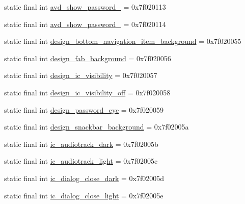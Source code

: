 \begin{CompactItemize}
\item 
static final int \hyperlink{classandroid_1_1support_1_1v7_1_1recyclerview_1_1_r_1_1drawable_74c7af79271260b43cedd3fce8579c79}{avd\_\-show\_\-password\_} = 0x7f020113
\item 
static final int \hyperlink{classandroid_1_1support_1_1v7_1_1recyclerview_1_1_r_1_1drawable_d66f2029f7a8aa3859f6184577970aae}{avd\_\-show\_\-password\_} = 0x7f020114
\item 
static final int \hyperlink{classandroid_1_1support_1_1v7_1_1recyclerview_1_1_r_1_1drawable_83bdac0f055b237cb94d578ec915cc51}{design\_\-bottom\_\-navigation\_\-item\_\-background} = 0x7f020055
\item 
static final int \hyperlink{classandroid_1_1support_1_1v7_1_1recyclerview_1_1_r_1_1drawable_f5de89861ad08bd26243d26653197e89}{design\_\-fab\_\-background} = 0x7f020056
\item 
static final int \hyperlink{classandroid_1_1support_1_1v7_1_1recyclerview_1_1_r_1_1drawable_00e107747e528669d20fd26da4a9e37b}{design\_\-ic\_\-visibility} = 0x7f020057
\item 
static final int \hyperlink{classandroid_1_1support_1_1v7_1_1recyclerview_1_1_r_1_1drawable_1c16d18d692fec157cc0f9fa1e07d2ea}{design\_\-ic\_\-visibility\_\-off} = 0x7f020058
\item 
static final int \hyperlink{classandroid_1_1support_1_1v7_1_1recyclerview_1_1_r_1_1drawable_e5aac3657fd7a72de8d84596912ac0f2}{design\_\-password\_\-eye} = 0x7f020059
\item 
static final int \hyperlink{classandroid_1_1support_1_1v7_1_1recyclerview_1_1_r_1_1drawable_1f7cb389cba1eeed8c1cbf5997fe1b33}{design\_\-snackbar\_\-background} = 0x7f02005a
\item 
static final int \hyperlink{classandroid_1_1support_1_1v7_1_1recyclerview_1_1_r_1_1drawable_38f4e03ddfe1f309c8ead31833b3940f}{ic\_\-audiotrack\_\-dark} = 0x7f02005b
\item 
static final int \hyperlink{classandroid_1_1support_1_1v7_1_1recyclerview_1_1_r_1_1drawable_44375aad330cabc8244c6468972e2a3f}{ic\_\-audiotrack\_\-light} = 0x7f02005c
\item 
static final int \hyperlink{classandroid_1_1support_1_1v7_1_1recyclerview_1_1_r_1_1drawable_aebd5f7b1672116294d261608166ff2e}{ic\_\-dialog\_\-close\_\-dark} = 0x7f02005d
\item 
static final int \hyperlink{classandroid_1_1support_1_1v7_1_1recyclerview_1_1_r_1_1drawable_5197411e267f6256a8f9476a3e07e194}{ic\_\-dialog\_\-close\_\-light} = 0x7f02005e

\end{CompactItemize}

